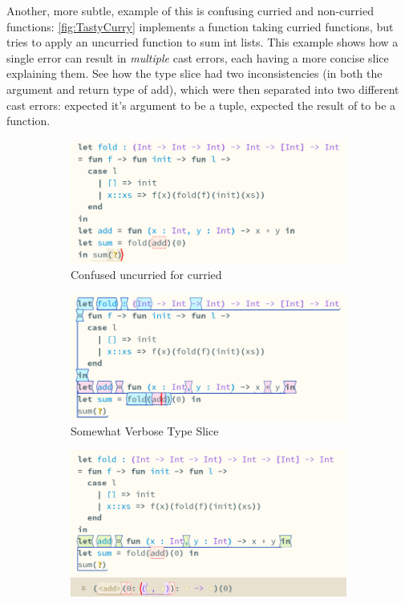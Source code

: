 Another, more subtle, example of this is confusing curried and non-curried functions: \cref{fig:TastyCurry} implements a  function taking curried functions, but tries to apply an uncurried  function to sum int lists. This example shows how a single error can result in \textit{multiple} cast errors, each having a more concise slice explaining them. See how the type slice had two inconsistencies (in both the argument and return type of add), which were then separated into two different cast errors:  expected it's argument to be a tuple,  expected the result of  to be a function.

\begin{figure}[h]
\begin{subfigure}{0.49\textwidth}
\includegraphics[width=1\textwidth]{Media/Figures/curries}
\caption{Confused uncurried for curried }
\end{subfigure}
\begin{subfigure}{0.49\textwidth}
\includegraphics[width=1\textwidth]{Media/Figures/curries_type_slice}
\caption{Somewhat Verbose Type Slice}
\end{subfigure}
\begin{subfigure}{0.49\textwidth}
\includegraphics[width=1\textwidth]{Media/Figures/curries_expects_tuple}

\end{subfigure}
\end{figure}
